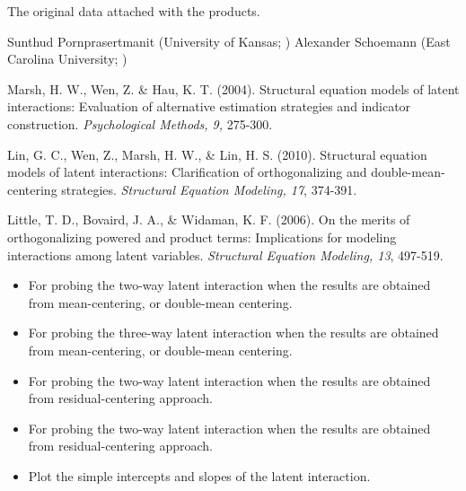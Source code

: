 \documentclass[a4paper]{book}
\begin{document}
%
\begin{Value}
The original data attached with the products.
\end{Value}
%
\begin{Author}\relax
Sunthud Pornprasertmanit (University of Kansas; )
Alexander Schoemann (East Carolina University; )
\end{Author}
%
\begin{References}\relax
Marsh, H. W., Wen, Z. \& Hau, K. T. (2004). Structural equation models of latent interactions: Evaluation of alternative estimation strategies and indicator construction. \emph{Psychological Methods, 9,} 275-300.

Lin, G. C., Wen, Z., Marsh, H. W., \& Lin, H. S. (2010). Structural equation models of latent interactions: Clarification of orthogonalizing and double-mean-centering strategies. \emph{Structural Equation Modeling, 17}, 374-391.

Little, T. D., Bovaird, J. A., \& Widaman, K. F. (2006). On the merits of orthogonalizing powered and product terms: Implications for modeling interactions among latent variables. \emph{Structural Equation Modeling, 13}, 497-519.
\end{References}
%
\begin{SeeAlso}\relax
\begin{itemize}

\item {} For probing the two-way latent interaction when the results are obtained from mean-centering, or double-mean centering.
\item {} For probing the three-way latent interaction when the results are obtained from mean-centering, or double-mean centering.
\item {} For probing the two-way latent interaction when the results are obtained from residual-centering approach.
\item {} For probing the two-way latent interaction when the results are obtained from residual-centering approach.
\item {} Plot the simple intercepts and slopes of the latent interaction.

\end{itemize}

\end{SeeAlso}
%
\end{document}
